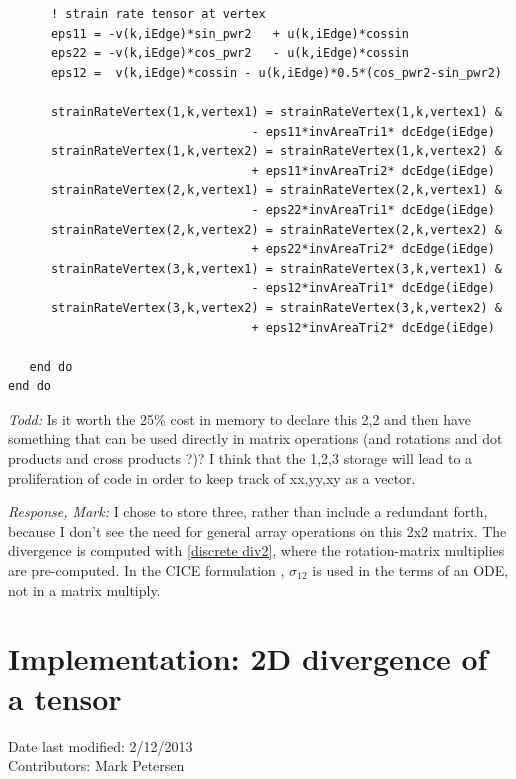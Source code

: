 \documentclass[11pt]{report}
\begin{document}
\begin{verbatim}
      ! strain rate tensor at vertex
      eps11 = -v(k,iEdge)*sin_pwr2   + u(k,iEdge)*cossin
      eps22 = -v(k,iEdge)*cos_pwr2   - u(k,iEdge)*cossin
      eps12 =  v(k,iEdge)*cossin - u(k,iEdge)*0.5*(cos_pwr2-sin_pwr2)

      strainRateVertex(1,k,vertex1) = strainRateVertex(1,k,vertex1) &
                                  - eps11*invAreaTri1* dcEdge(iEdge)
      strainRateVertex(1,k,vertex2) = strainRateVertex(1,k,vertex2) &
                                  + eps11*invAreaTri2* dcEdge(iEdge)
      strainRateVertex(2,k,vertex1) = strainRateVertex(2,k,vertex1) &
                                  - eps22*invAreaTri1* dcEdge(iEdge)
      strainRateVertex(2,k,vertex2) = strainRateVertex(2,k,vertex2) &
                                  + eps22*invAreaTri2* dcEdge(iEdge)
      strainRateVertex(3,k,vertex1) = strainRateVertex(3,k,vertex1) &
                                  - eps12*invAreaTri1* dcEdge(iEdge)
      strainRateVertex(3,k,vertex2) = strainRateVertex(3,k,vertex2) &
                                  + eps12*invAreaTri2* dcEdge(iEdge)

   end do
end do
\end{verbatim}
\newpage
{\it Todd:} Is it worth the 25\% cost in memory to declare this 2,2 and then have something that can be used directly in matrix operations (and rotations and dot products and cross products ?)? I think that the 1,2,3 storage will lead to a proliferation of code in order to keep track of xx,yy,xy as a vector.

{\it Response, Mark:} I chose to store three, rather than include a redundant forth, because I don't see the need for general array operations on this 2x2 matrix.  The divergence is computed with \ref{discrete div2}, where the rotation-matrix multiplies are pre-computed.  In the CICE formulation \cite[section 3.4, equation 52]{CICE_manual_4.1}, $\sigma_{12}$ is used in the terms of an ODE, not in a matrix multiply.
   

\newpage
\section{Implementation: 2D divergence of a tensor}
Date last modified: 2/12/2013 \\
Contributors: Mark Petersen \\
\end{document}

